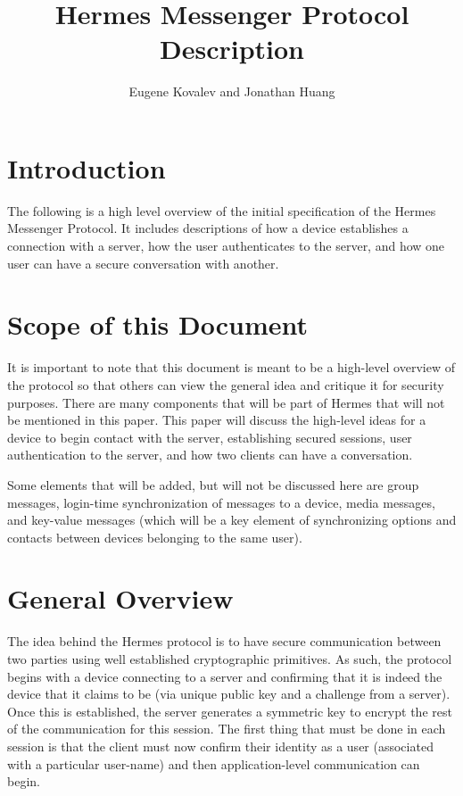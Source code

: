 \documentclass{article}
\begin{document}
\title{Hermes Messenger Protocol Description}
\author{Eugene Kovalev and Jonathan Huang}

\maketitle

\section{Introduction}

The following is a high level overview of the initial specification of the Hermes Messenger Protocol. It includes descriptions of how a device establishes a connection with a server, how the user authenticates to the server, and how one user can have a secure conversation with another.

\section{Scope of this Document}

It is important to note that this document is meant to be a high-level overview of the protocol so that others can view the general idea and critique it for security purposes. There are many components that will be part of Hermes that will not be mentioned in this paper. This paper will discuss the high-level ideas for a device to begin contact with the server, establishing secured sessions, user authentication to the server, and how two clients can have a conversation.

Some elements that will be added, but will not be discussed here are group messages, login-time synchronization of messages to a device, media messages, and key-value messages (which will be a key element of synchronizing options and contacts between devices belonging to the same user).

\section{General Overview}

The idea behind the Hermes protocol is to have secure communication between two parties using well established cryptographic primitives. As such, the protocol begins with a device connecting to a server and confirming that it is indeed the device that it claims to be (via unique public key and a challenge from a server). Once this is established, the server generates a symmetric key to encrypt the rest of the communication for this session. The first thing that must be done in each session is that the client must now confirm their identity as a user (associated with a particular user-name) and then application-level communication can begin.
\end{document}
